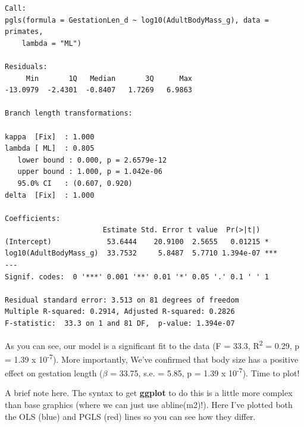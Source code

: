 \documentclass[
]{book}
\begin{document}
\begin{verbatim}
Call:
pgls(formula = GestationLen_d ~ log10(AdultBodyMass_g), data = primates, 
    lambda = "ML")

Residuals:
     Min       1Q   Median       3Q      Max 
-13.0979  -2.4301  -0.8407   1.7269   6.9863 

Branch length transformations:

kappa  [Fix]  : 1.000
lambda [ ML]  : 0.805
   lower bound : 0.000, p = 2.6579e-12
   upper bound : 1.000, p = 1.042e-06
   95.0% CI   : (0.607, 0.920)
delta  [Fix]  : 1.000

Coefficients:
                       Estimate Std. Error t value  Pr(>|t|)    
(Intercept)             53.6444    20.9100  2.5655   0.01215 *  
log10(AdultBodyMass_g)  33.7532     5.8487  5.7710 1.394e-07 ***
---
Signif. codes:  0 '***' 0.001 '**' 0.01 '*' 0.05 '.' 0.1 ' ' 1

Residual standard error: 3.513 on 81 degrees of freedom
Multiple R-squared: 0.2914, Adjusted R-squared: 0.2826 
F-statistic:  33.3 on 1 and 81 DF,  p-value: 1.394e-07 
\end{verbatim}

As you can see, our model is a significant fit to the data (F = 33.3, R\textsuperscript{2} = 0.29, p = 1.39 x 10\textsuperscript{-7}). More importantly, We've confirmed that body size has a positive effect on gestation length (\(\beta\) = 33.75, s.e. = 5.85, p = 1.39 x 10\textsuperscript{-7}). Time to plot!

A brief note here. The syntax to get \textbf{ggplot} to do this is a little more complex than base graphics (where we can just use abline(m2)!). Here I've plotted both the OLS (blue) and PGLS (red) lines so you can see how they differ.
\end{document}
